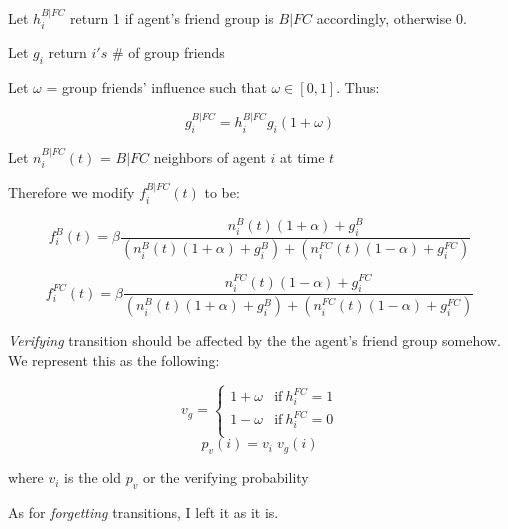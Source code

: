 \documentclass{article}
\begin{document}
Let $h_i^{B|FC}$ return 1 if agent's friend group is $B|FC$ accordingly, otherwise 0.

Let $g_i$ return $i's$ \# of group friends

Let $\omega$ = group friends' influence such that $\omega \in [0,1]$. Thus:

\[g_i^{B|FC} = h_i^{B|FC}g_i(1+\omega)\]

Let $n_i^{B|FC}(t)$ = $B|FC$ neighbors of agent $i$ at time $t$

Therefore we modify $f_i^{B|FC}(t)$ to be:

\[f_i^B(t)=\beta\frac{n_i^B(t)(1+\alpha)+g_i^B}{(n_i^B(t)(1+\alpha)+g_i^B)+(n_i^{FC}(t)(1-\alpha)+g_i^{FC})}\]

\[f_i^{FC}(t)=\beta\frac{n_i^{FC}(t)(1-\alpha)+g_i^{FC}}{(n_i^B(t)(1+\alpha)+g_i^B)+(n_i^{FC}(t)(1-\alpha)+g_i^{FC})}\]

\textit{Verifying} transition should be affected by the
the agent's friend group somehow. We represent this as
the following:

\[ 
  v_g = 
  \begin{cases} 
      1+\omega & \text{if}\ h_i^{FC} = 1 \\
      1-\omega & \text{if}\ h_i^{FC} = 0 \\
  \end{cases}
\]
\[ p_v(i) = v_i\;v_g(i) \]

where $v_i$ is the old $p_v$ or the verifying probability

As for \textit{forgetting} transitions, I left it as it is.
%
%
%
%
%
\end{document}
